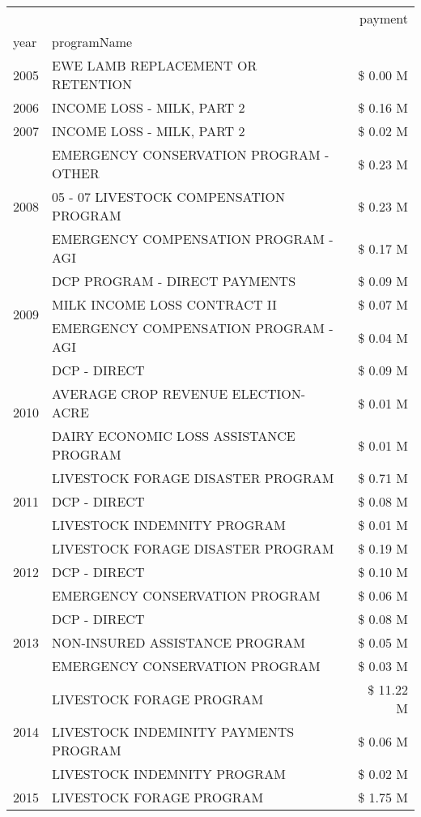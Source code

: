\begin{tabular}{llr}
\toprule
 &  & payment \\
year & programName &  \\
\midrule
2005 & EWE LAMB REPLACEMENT OR RETENTION & \$ 0.00 M \\
\cline{1-3}
2006 & INCOME LOSS - MILK, PART 2 & \$ 0.16 M \\
\cline{1-3}
2007 & INCOME LOSS - MILK, PART 2 & \$ 0.02 M \\
\cline{1-3}
\multirow[t]{3}{*}{2008} & EMERGENCY CONSERVATION PROGRAM - OTHER & \$ 0.23 M \\
 & 05 - 07 LIVESTOCK COMPENSATION PROGRAM & \$ 0.23 M \\
 & EMERGENCY COMPENSATION PROGRAM - AGI & \$ 0.17 M \\
\cline{1-3}
\multirow[t]{3}{*}{2009} & DCP PROGRAM - DIRECT PAYMENTS & \$ 0.09 M \\
 & MILK INCOME LOSS CONTRACT II & \$ 0.07 M \\
 & EMERGENCY COMPENSATION PROGRAM - AGI & \$ 0.04 M \\
\cline{1-3}
\multirow[t]{3}{*}{2010} & DCP - DIRECT & \$ 0.09 M \\
 & AVERAGE CROP REVENUE ELECTION-ACRE & \$ 0.01 M \\
 & DAIRY ECONOMIC LOSS ASSISTANCE PROGRAM & \$ 0.01 M \\
\cline{1-3}
\multirow[t]{3}{*}{2011} & LIVESTOCK FORAGE DISASTER PROGRAM & \$ 0.71 M \\
 & DCP - DIRECT & \$ 0.08 M \\
 & LIVESTOCK INDEMNITY PROGRAM & \$ 0.01 M \\
\cline{1-3}
\multirow[t]{3}{*}{2012} & LIVESTOCK FORAGE DISASTER PROGRAM & \$ 0.19 M \\
 & DCP - DIRECT & \$ 0.10 M \\
 & EMERGENCY CONSERVATION PROGRAM & \$ 0.06 M \\
\cline{1-3}
\multirow[t]{3}{*}{2013} & DCP - DIRECT & \$ 0.08 M \\
 & NON-INSURED ASSISTANCE PROGRAM & \$ 0.05 M \\
 & EMERGENCY CONSERVATION PROGRAM & \$ 0.03 M \\
\cline{1-3}
\multirow[t]{3}{*}{2014} & LIVESTOCK FORAGE PROGRAM & \$ 11.22 M \\
 & LIVESTOCK INDEMINITY PAYMENTS PROGRAM & \$ 0.06 M \\
 & LIVESTOCK INDEMNITY PROGRAM & \$ 0.02 M \\
\cline{1-3}
\multirow[t]{3}{*}{2015} & LIVESTOCK FORAGE PROGRAM & \$ 1.75 M \\

\end{tabular}

